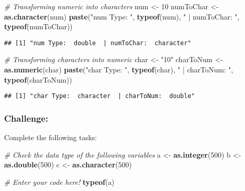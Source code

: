\documentclass[
]{article}
\newenvironment{Shaded}{\begin{snugshade}}{\end{snugshade}}
\newcommand{\CommentTok}[1]{\textcolor[rgb]{0.56,0.35,0.01}{\textit{#1}}}
\newcommand{\DecValTok}[1]{\textcolor[rgb]{0.00,0.00,0.81}{#1}}
\newcommand{\FunctionTok}[1]{\textcolor[rgb]{0.13,0.29,0.53}{\textbf{#1}}}
\newcommand{\NormalTok}[1]{#1}
\newcommand{\OtherTok}[1]{\textcolor[rgb]{0.56,0.35,0.01}{#1}}
\newcommand{\StringTok}[1]{\textcolor[rgb]{0.31,0.60,0.02}{#1}}
\begin{document}
\begin{Shaded}
\begin{Highlighting}[]
\CommentTok{\# Transforming numeric into characters}
\NormalTok{num }\OtherTok{\textless{}{-}} \DecValTok{10}
\NormalTok{numToChar }\OtherTok{\textless{}{-}} \FunctionTok{as.character}\NormalTok{(num)}
\FunctionTok{paste}\NormalTok{(}\StringTok{"num Type: "}\NormalTok{, }\FunctionTok{typeof}\NormalTok{(num), }\StringTok{" | numToChar: "}\NormalTok{, }\FunctionTok{typeof}\NormalTok{(numToChar))}
\end{Highlighting}
\end{Shaded}

\begin{verbatim}
## [1] "num Type:  double  | numToChar:  character"
\end{verbatim}

\begin{Shaded}
\begin{Highlighting}[]
\CommentTok{\# Transforming characters into numeric}
\NormalTok{char }\OtherTok{\textless{}{-}} \StringTok{"10"}
\NormalTok{charToNum }\OtherTok{\textless{}{-}} \FunctionTok{as.numeric}\NormalTok{(char)}
\FunctionTok{paste}\NormalTok{(}\StringTok{"char Type: "}\NormalTok{, }\FunctionTok{typeof}\NormalTok{(char), }\StringTok{" | charToNum: "}\NormalTok{, }\FunctionTok{typeof}\NormalTok{(charToNum))}
\end{Highlighting}
\end{Shaded}

\begin{verbatim}
## [1] "char Type:  character  | charToNum:  double"
\end{verbatim}

\subsubsection{Challenge:}\label{challenge}

Complete the following tasks:

\begin{Shaded}
\begin{Highlighting}[]
\CommentTok{\# Check the data type of the following variables}
\NormalTok{a }\OtherTok{\textless{}{-}} \FunctionTok{as.integer}\NormalTok{(}\DecValTok{500}\NormalTok{)}
\NormalTok{b }\OtherTok{\textless{}{-}} \FunctionTok{as.double}\NormalTok{(}\DecValTok{500}\NormalTok{)}
\NormalTok{c }\OtherTok{\textless{}{-}} \FunctionTok{as.character}\NormalTok{(}\DecValTok{500}\NormalTok{)}

\CommentTok{\# Enter your code here!}
\FunctionTok{typeof}\NormalTok{(a)}
\end{Highlighting}
\end{Shaded}
\end{document}
